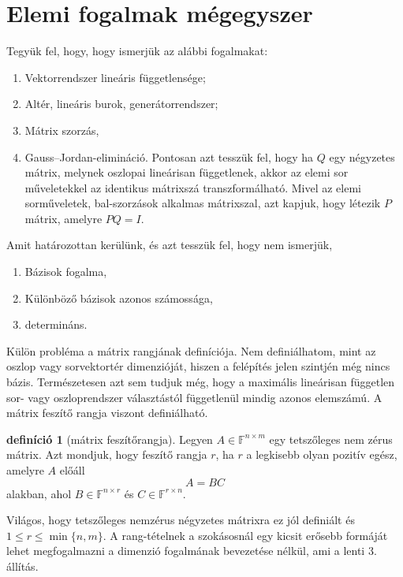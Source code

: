 \documentclass[9pt, a4paper, showtrims]{memoir}
\theoremstyle{plain}
\theoremstyle{remark}
\theoremstyle{definition}
\newtheorem{definition}[proposition]{definíció}
\begin{document}
\chapter*{Elemi fogalmak mégegyszer}
Tegyük fel, hogy, hogy ismerjük az alábbi fogalmakat:
\begin{enumerate}
    \item Vektorrendszer lineáris függetlensége;
    \item Altér, lineáris burok, generátorrendszer;
    \item Mátrix szorzás,
    \item Gauss--Jordan-elimináció.  Pontosan azt tesszük fel, hogy ha $Q$ egy négyzetes mátrix, melynek oszlopai
        lineárisan függetlenek, akkor az elemi sor műveletekkel az identikus mátrixszá transzformálható.
        Mivel az elemi sorműveletek, bal-szorzások alkalmas mátrixszal, 
        azt kapjuk, hogy létezik $P$ mátrix, amelyre $PQ=I$.
\end{enumerate}
Amit határozottan kerülünk, és azt tesszük fel, hogy nem ismerjük,
\begin{enumerate}
    \item Bázisok fogalma,
    \item Különböző bázisok azonos számossága,
    \item determináns.
\end{enumerate}
Külön probléma a mátrix rangjának definíciója.
Nem definiálhatom, 
mint az oszlop vagy sorvektortér dimenzióját, hiszen a felépítés jelen szintjén még nincs bázis.
Természetesen azt sem tudjuk még, hogy a maximális lineárisan független sor- vagy oszloprendszer választástól függetlenül mindig azonos elemszámú.
A mátrix feszítő rangja viszont definiálható.
\begin{definition}[mátrix feszítőrangja]
    Legyen $A\in\mathbb{F}^{n\times m}$ egy tetszőleges nem zérus mátrix.
    Azt mondjuk, hogy feszítő rangja $r$, ha $r$ a legkisebb olyan pozitív egész, amelyre $A$ előáll
    \[
        A=BC
    \]
    alakban, ahol $B\in\mathbb{F}^{n\times r}$ és $C\in\mathbb{F}^{r\times n}$.
\end{definition}
Világos, hogy tetszőleges nemzérus négyzetes mátrixra ez jól definiált és $1\leq r \leq \min\{n,m\}$.
A rang-tételnek a szokásosnál egy kicsit erősebb formáját lehet megfogalmazni a dimenzió fogalmának bevezetése nélkül,
ami a lenti 3. állítás.
\end{document}
